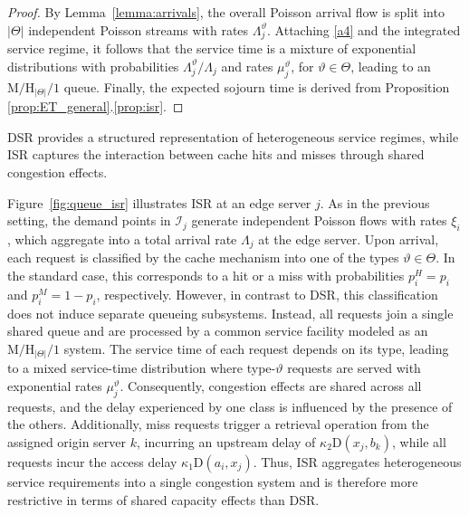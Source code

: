 \documentclass[a4paper,11pt,reqno]{amsart}
\newcommand{\D}{\mathrm{D}}
\begin{document}
\begin{proof}
    By Lemma~\ref{lemma:arrivals}, the overall Poisson arrival flow is split into $|\Theta|$ independent Poisson streams with rates $\Lambda_j^\vartheta$. Attaching \ref{a4} and the integrated service regime, it follows that the service time is a mixture of exponential distributions with probabilities $\Lambda_j^\vartheta/\Lambda_j$ and rates $\mu_j^\vartheta$, for $\vartheta \in \Theta$, leading to an $\mathrm{M}/\mathrm{H}_{|\Theta|}/1$ queue. Finally, the expected sojourn time is derived from Proposition \ref{prop:ET_general}.\ref{prop:isr}.
\end{proof}

DSR provides a structured representation of heterogeneous service regimes, while ISR captures the interaction between cache hits and misses through shared congestion effects.

Figure~\ref{fig:queue_isr} illustrates ISR at an edge server $j$. As in the previous setting, the demand points in $\mathcal I_j$ generate independent Poisson flows with rates $\xi_i$, which aggregate into a total arrival rate $\Lambda_j$ at the edge server. Upon arrival, each request is classified by the cache mechanism into one of the types $\vartheta\in\Theta$. In the standard case, this corresponds to a hit or a miss with probabilities $p_i^H = p_i$ and $p_i^M=1-p_i$, respectively. However, in contrast to DSR, this classification does not induce separate queueing subsystems. Instead, all requests join a single shared queue and are processed by a common service facility modeled as an $\mathrm{M}/\mathrm{H}_{|\Theta|}/1$ system. The service time of each request depends on its type, leading to a mixed service-time distribution where type-$\vartheta$ requests are served with exponential rates $\mu_j^\vartheta$. Consequently, congestion effects are shared across all requests, and the delay experienced by one class is influenced by the presence of the others. Additionally, miss requests trigger a retrieval operation from the assigned origin server $k$, incurring an upstream delay of $\kappa_2 \D(x_j,b_k)$, while all requests incur the access delay $\kappa_1 \D(a_i,x_j)$. 
Thus, ISR aggregates heterogeneous service requirements into a single congestion system and is therefore more restrictive in terms of shared capacity effects than DSR.
\end{document}
